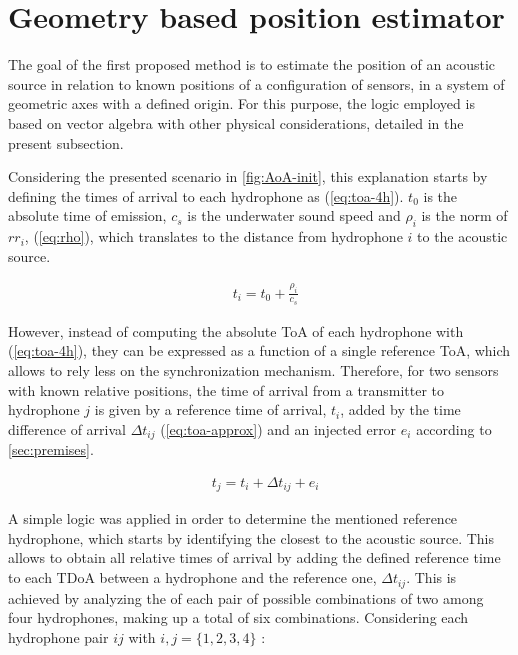 
\section{Geometry based position estimator} \label{subsec:estimator}

The goal of the first proposed method is to estimate the position of an acoustic source in relation to known positions of a configuration of sensors, in a system of geometric axes with a defined origin. For this purpose, the logic employed is based on vector algebra with other physical considerations, detailed in the present subsection. 

Considering the presented scenario in \ref{fig:AoA-init}, this explanation starts by defining the times of arrival to each hydrophone as (\ref{eq:toa-4h}). $t_0$ is the absolute time of emission, $c_s$ is the underwater sound speed and $\rho_i$ is the norm of $rr_i$, (\ref{eq:rho}), which translates to the distance from hydrophone $i$ to the acoustic source.

\begin{eqnarray}
	& t_i = t_0 +  \frac{\rho_i}{c_s}
	\label{eq:toa-4h}
\end{eqnarray}

However, instead of computing the absolute ToA of each hydrophone with (\ref{eq:toa-4h}), they can be expressed as a function of a single reference ToA, which allows to rely less on the synchronization mechanism. Therefore, for two sensors with known relative positions, the time of arrival from a transmitter to hydrophone $j$ is given by a reference time of arrival, $t_{i}$, added by the time difference of arrival $\Delta t_{ij}$ (\ref{eq:toa-approx}) and an injected error $e_i$ according to \ref{sec:premises}. 

\begin{eqnarray}
& t_j = t_{i} + \Delta t_{ij} + e_i
\label{eq:toa-approx}
\end{eqnarray}

A simple logic was applied in order to determine the mentioned reference hydrophone, which starts by identifying the closest to the acoustic source. This allows to obtain all relative times of arrival by adding the defined reference time to each TDoA between a hydrophone and the reference one, $ \Delta t_{ij}$. This is achieved by analyzing the of each pair of possible combinations of two among four hydrophones, making up a total of six combinations. Considering each hydrophone pair $ij$ with $i, j= \{1,2,3,4\}$ :

